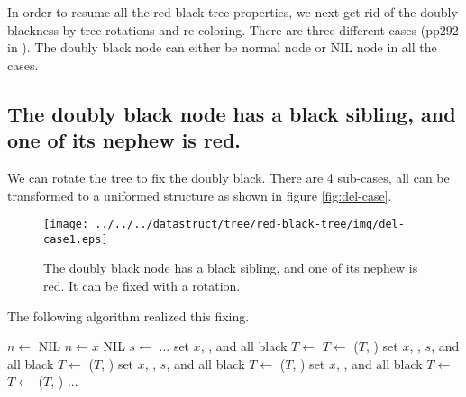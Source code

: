 \documentclass[UTF8]{article}
\begin{document}
In order to resume all the red-black tree properties, we next get rid of the doubly blackness by tree rotations and re-coloring. There are three different cases (pp292 in \cite{CLRS}). The doubly black node can either be normal node or NIL node in all the cases.

\subsection{The doubly black node has a black sibling, and one of its nephew is red.}
We can rotate the tree to fix the doubly black. There are 4 sub-cases, all can be transformed to a uniformed structure as shown in figure \ref{fig:del-case}.

\begin{figure}[htbp]
   \centering
   \texttt{[image: ../../../datastruct/tree/red-black-tree/img/del-case1.eps]}
   \caption{The doubly black node has a black sibling, and one of its nephew is red. It can be fixed with a rotation.}
   \label{fig:del-case1}
\end{figure}

The following algorithm realized this fixing.

\begin{algorithmic}[1]
  \State $n \gets$ NIL
    
    \State $n \gets x$
  \EndIf
   
    \State \Return NIL
  \EndIf
     
        \State $s \gets$ 
        \State ...
            \State set $x$, , and  all black
            \State $T \gets$ 
            \State $T \gets$ ($T$, )
          \Else {}
            \State set $x$, , $s$, and  all black
            \State $T \gets$ ($T$, )
          \EndIf
           
            \State set $x$, , $s$, and  all black
            \State $T \gets$ ($T$, )
          \Else {}
            \State set $x$, , and  all black
            \State $T \gets$ 
            \State $T \gets$ ($T$, )
          \EndIf
        \State ...
        \EndIf
    \EndIf
  \EndWhile
\EndFunction
\end{algorithmic}
\end{document}
